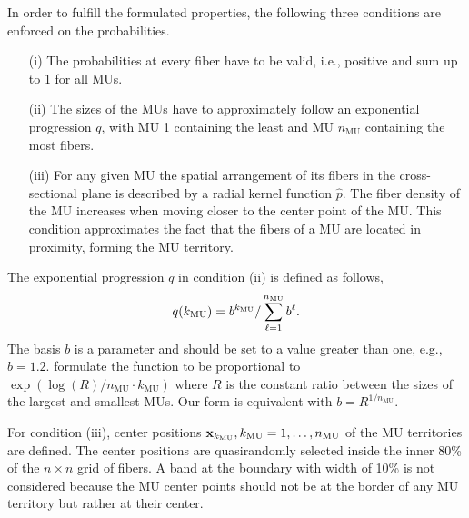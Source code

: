 In order to fulfill the formulated properties, the following three conditions are enforced on the probabilities. 
\begin{itemize}
\item[(i)] The probabilities at every fiber  have to be valid, i.e., positive and sum up to 1 for all MUs.
\item[(ii)] The sizes of the MUs have to approximately follow an exponential progression $q$, with MU 1 containing the least and MU $n_\text{MU}$ containing the most fibers.
\item[(iii)] For any given MU the spatial arrangement of its fibers in the cross-sectional plane is described by a radial kernel function $\hat{p}$. The fiber density of the MU increases when moving closer to the center point of the MU. This condition approximates the fact that the fibers of a MU are located in proximity, forming the MU territory.
\end{itemize}

The exponential progression $q$ in condition (ii) is defined as follows,
%
\begin{align}\label{eq:mus_q}
  q(k_\text{MU}) = b^{k_\text{MU}} / \displaystyle\sum\limits_{\ell=1}^{n_\text{MU}} b^\ell.
\end{align}
%
%
% 
The basis $b$ is a parameter and should be set to a value greater than one, e.g., $b=\num{1.2}$. \Cite{Enoka2001} formulate the function to be proportional to $\exp(\log(R)/n_\text{MU}\cdot k_\text{MU})$ where $R$ is the constant ratio between the sizes of the largest and smallest MUs. Our form is equivalent with $b = R^{1/n_\text{MU}}$.

For condition (iii), center positions $\textbf{x}_{k_\text{MU}}, k_\text{MU}=1, \dots, n_\text{MU}$ of the MU territories are defined. 
The center positions are quasirandomly selected inside the inner 80\% of the $n \times n$ grid of fibers. A band at the boundary with width of 10\% is not considered because the MU center points should not be at the border of any MU territory but rather at their center.

